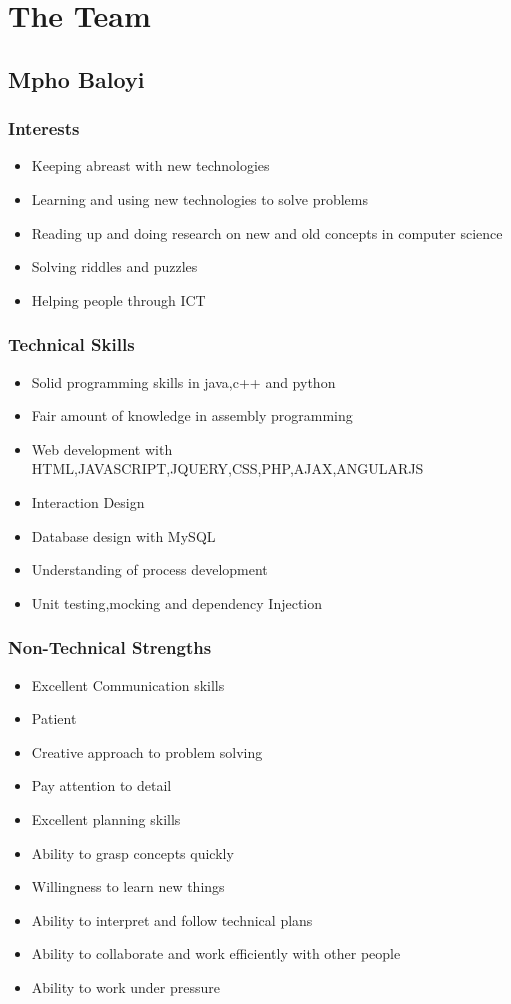 \documentclass[a4paper,12pt]{article}
\begin{document}
\section{The Team}
\subsection{Mpho Baloyi}
\subsubsection{Interests}
\begin{itemize}
\item Keeping abreast with new technologies
\item Learning and using new technologies to solve problems
\item Reading up and doing research on new and old concepts in computer science
\item Solving riddles and puzzles
\item Helping people through ICT
\end{itemize}
\subsubsection{Technical Skills}
\begin{itemize}
\item Solid programming skills in java,c++ and python
\item Fair amount of knowledge in assembly programming
\item Web development with HTML,JAVASCRIPT,JQUERY,CSS,PHP,AJAX,ANGULARJS
\item Interaction Design
\item Database design with MySQL
\item Understanding of process development
\item Unit testing,mocking and dependency Injection
\end{itemize}
\subsubsection{Non-Technical Strengths}
\begin{itemize}
\item Excellent Communication skills
\item Patient
\item Creative approach to problem solving
\item Pay attention to detail
\item Excellent planning skills
\item Ability to grasp concepts quickly
\item Willingness to learn new things
\item Ability to interpret and follow technical plans
\item Ability to collaborate and work efficiently with other people
\item Ability to work under pressure
\end{itemize}
\end{document}
